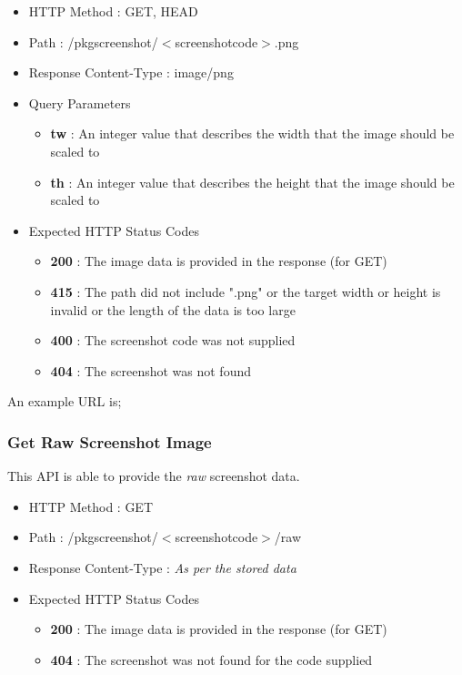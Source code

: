 \begin{itemize}
\item HTTP Method : GET, HEAD
\item Path : /pkgscreenshot/$<$screenshotcode$>$.png
\item Response Content-Type : image/png
\item Query Parameters
  \begin{itemize}
  \item {\bf tw} : An integer value that describes the width that the image should be scaled to
  \item {\bf th} : An integer value that describes the height that the image should be scaled to
  \end{itemize}
\item Expected HTTP Status Codes
  \begin{itemize}
  \item {\bf 200} : The image data is provided in the response (for GET)
  \item {\bf 415} : The path did not include ".png" or the target width or height is invalid or the length of the data is too large
  \item {\bf 400} : The screenshot code was not supplied
  \item {\bf 404} : The screenshot was not found
  \end{itemize}
\end{itemize}

An example URL is;


\subsubsection{Get Raw Screenshot Image}

This API is able to provide the {\it raw} screenshot data.

\begin{itemize}
\item HTTP Method : GET
\item Path : /pkgscreenshot/$<$screenshotcode$>$/raw
\item Response Content-Type : {\it As per the stored data}
\item Expected HTTP Status Codes
  \begin{itemize}
  \item {\bf 200} : The image data is provided in the response (for GET)
  \item {\bf 404} : The screenshot was not found for the code supplied
  \end{itemize}
\end{itemize}

